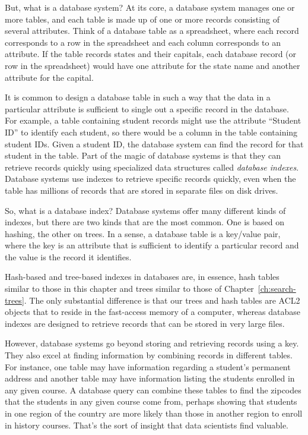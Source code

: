 But, what is a database system? At its core, a database system
manages one or more tables, and each table is made up of one or more
records consisting of several attributes.
Think of a database table as a
spreadsheet, where each record corresponds to a row in the spreadsheet
and each column corresponds to an attribute. If the table
records states and their capitals, each database
record (or row in the spreadsheet) would have one attribute for the
state name and another attribute for the capital.

It is common to design a database table in such a way that the
data in a particular attribute is sufficient
to single out a specific record in the database.
For example, a table containing student records might use the attribute
``Student ID'' to identify each student, so there would be
a column in the table containing student IDs.
Given a student ID, the
database system can find the record for that student in the
table. Part of the magic of database systems is that they can retrieve
records quickly using specialized data
structures called \emph{database indexes}.
Database systems use indexes to retrieve specific records quickly,
even when the table has millions of records that are stored
in separate files on disk drives.

So, what is a database index? Database systems
offer many different kinds of indexes, but there are two kinds that are
the most common. One is based on hashing, the other on trees.
In a sense, a database
table is a key/value pair, where the key is an attribute that is
sufficient to identify a particular record and the value is the record
it identifies.

Hash-based and tree-based indexes
in databases are,
in essence, hash tables similar to those in this chapter
and trees similar to those of Chapter~\ref{ch:search-trees}.
The only substantial difference
is that our trees and hash tables are ACL2 objects that
to reside in the fast-access memory of a computer,
whereas database indexes are designed to retrieve records
that can be stored in very large files.

However, database systems go beyond storing and retrieving records
using a key. They also excel at finding information by combining
records in different tables. For instance, one table may have
information regarding a student's permanent address and another table
may have information listing the students enrolled in any given course.
A database query can combine these tables to find the zipcodes that
the students in any given course come from, perhaps showing that students in one
region of the country are more likely than those in another region to
enroll in history courses. That's the sort of insight that
data scientists find valuable.

